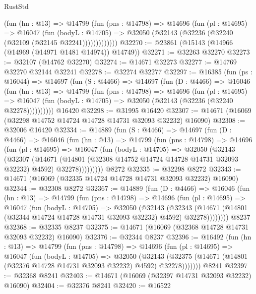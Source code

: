 \begin{lexlean}{RustStd}
\begin{coremodule}
            (fun (hn : @13) =>
            @14799
              (fun (pns : @14798) =>
              @14696
                (fun (pl : @14695) =>
                @16047
                  (fun (bodyL : @14705) =>
                  @32050 (@32143 (@32236 (@32240 (@32109 (@32145 @32241)))))))))))))
@32270 := @23861 (@15143 (@14966 (@14969 (@14971 @1481 @14974)) @14749))
@32271 := @32263 @32270
@32273 := @32107 (@14762 @32270)
@32274 := @14671 @32273
@32277 := @14769 @32270 @32144 @32241
@32278 := @32274 @32277
@32297 := @16385
    (fun (ps : @16044) =>
    @14697
      (fun (S : @4466) =>
      @14697
        (fun (D : @4466) =>
        @16046
          (fun (hn : @13) =>
          @14799
            (fun (pns : @14798) =>
            @14696
              (fun (pl : @14695) =>
              @16047 (fun (bodyL : @14705) => @32050 (@32143 (@32236 (@32240 @32278))))))))))
    @16420
@32298 := @31995 @16420
@32307 := @14671 (@16069 (@32298 @14752 @14724 @14728 @14731 @32093 @32232) @16090)
@32308 := @32006 @16420
@32334 := @14889
    (fun (S : @4466) =>
    @14697
      (fun (D : @4466) =>
      @16046
        (fun (hn : @13) =>
        @14799
          (fun (pns : @14798) =>
          @14696
            (fun (pl : @14695) =>
            @16047
              (fun (bodyL : @14705) =>
              @32050
                (@32143
                  (@32307
                    (@14671
                      (@14801 (@32308 @14752 @14724 @14728 @14731 @32093 @32232) @4592)
                      @32278)))))))))
    @8272
@32335 := @32298 @8272
@32343 := @14671 (@16069 (@32335 @14724 @14728 @14731 @32093 @32232) @16090)
@32344 := @32308 @8272
@32367 := @14889
    (fun (D : @4466) =>
    @16046
      (fun (hn : @13) =>
      @14799
        (fun (pns : @14798) =>
        @14696
          (fun (pl : @14695) =>
          @16047
            (fun (bodyL : @14705) =>
            @32050
              (@32143
                (@32343
                  (@14671 (@14801 (@32344 @14724 @14728 @14731 @32093 @32232) @4592) @32278))))))))
    @8237
@32368 := @32335 @8237
@32375 := @14671 (@16069 (@32368 @14728 @14731 @32093 @32232) @16090)
@32376 := @32344 @8237
@32396 := @16492
    (fun (hn : @13) =>
    @14799
      (fun (pns : @14798) =>
      @14696
        (fun (pl : @14695) =>
        @16047
          (fun (bodyL : @14705) =>
          @32050
            (@32143
              (@32375 (@14671 (@14801 (@32376 @14728 @14731 @32093 @32232) @4592) @32278)))))))
    @8241
@32397 := @32368 @8241
@32403 := @14671 (@16069 (@32397 @14731 @32093 @32232) @16090)
@32404 := @32376 @8241
@32420 := @16522

\end{coremodule}
\end{lexlean}
